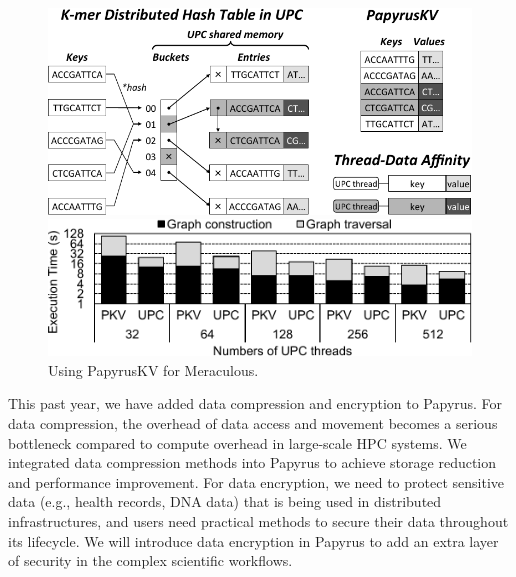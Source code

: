 \begin{figure}[t]
    \centering
    \begin{subfloat}
        \centering
        \includegraphics[width=.48\textwidth]{projects/2.3.2-Tools/2.3.2.09-PROTEAS/papyrus-meraculous}
    \end{subfloat}
    \hfill
    \begin{subfloat}
        \centering
        \includegraphics[width=.48\textwidth]{projects/2.3.2-Tools/2.3.2.09-PROTEAS/papyrus-meraculous-eval}
    \end{subfloat}
    \caption{Using PapyrusKV for Meraculous.}
\end{figure}



This past year, we have added data compression and encryption to Papyrus. For data compression, the overhead of data access and movement becomes a serious bottleneck compared to compute overhead in large-scale HPC systems. We integrated data compression methods into Papyrus to achieve storage reduction and performance improvement. 
For data encryption, we need to protect sensitive data (e.g., health records, DNA data) that is being used in distributed infrastructures, and users need practical methods to secure their data throughout its lifecycle. We will introduce data encryption in Papyrus to add an extra layer of security in the complex scientific workflows.


